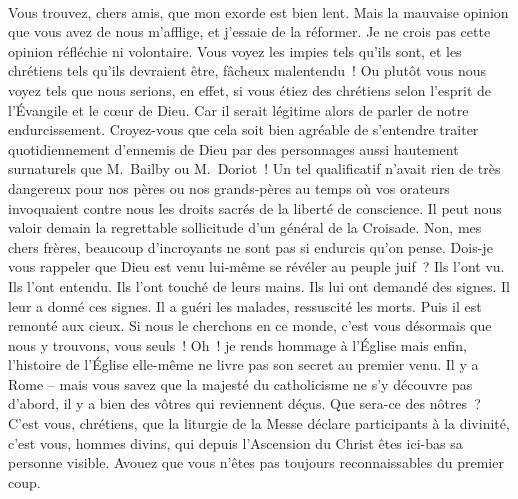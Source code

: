 \documentclass[french,twoside]{book} %
\newcommand{\astertri}{\medskip\par\centerline{\color{rubric}\large\selectfont{\syms ✻\,✻\,✻}}\medskip\par}%
\begin{document}
\astertri

\noindent  \par
Vous trouvez, chers amis, que mon exorde est bien lent. Mais la mauvaise opinion que vous avez de nous m’afflige, et j’essaie de la réformer. Je ne crois pas cette opinion réfléchie ni volontaire. Vous voyez les impies tels qu’ils sont, et les chrétiens tels qu’ils devraient être, fâcheux malentendu ! Ou plutôt vous nous voyez tels que nous serions, en effet, si vous étiez des chrétiens selon l’esprit de l’Évangile et le cœur de Dieu. Car il serait légitime alors de parler de notre endurcissement. Croyez-vous que cela soit bien agréable de s’entendre traiter quotidiennement d’ennemis de Dieu par des personnages aussi hautement surnaturels que M. Bailby ou M. Doriot ! Un tel qualificatif n’avait rien de très dangereux pour nos pères ou nos grands-pères au temps où vos orateurs invoquaient contre nous les droits sacrés de la liberté de conscience. Il peut nous valoir demain la regrettable sollicitude d’un général de la Croisade. Non, mes chers frères, beaucoup d’incroyants ne sont pas si endurcis qu’on pense. Dois-je vous rappeler que Dieu est venu lui-même se révéler au peuple juif ? Ils l’ont vu. Ils l’ont entendu. Ils l’ont touché de leurs mains. Ils lui ont demandé des signes. Il leur a donné ces signes. Il a guéri les malades, ressuscité les morts. Puis il est remonté aux cieux. Si nous le cherchons en ce monde, c’est vous désormais que nous y trouvons, vous seuls ! Oh ! je rends hommage à l’Église mais enfin, l’histoire de l’Église elle-même ne livre pas son secret au premier venu. Il y a Rome – mais vous savez que la majesté du catholicisme ne s’y découvre pas d’abord, il y a bien des vôtres qui reviennent déçus. Que sera-ce des nôtres ? C’est vous, chrétiens, que la liturgie de la Messe déclare participants à la divinité, c’est vous, hommes divins, qui depuis l’Ascension du Christ êtes ici-bas sa personne visible. Avouez que vous n’êtes pas toujours reconnaissables du premier coup.\par
 \par

\astertri
\end{document}
